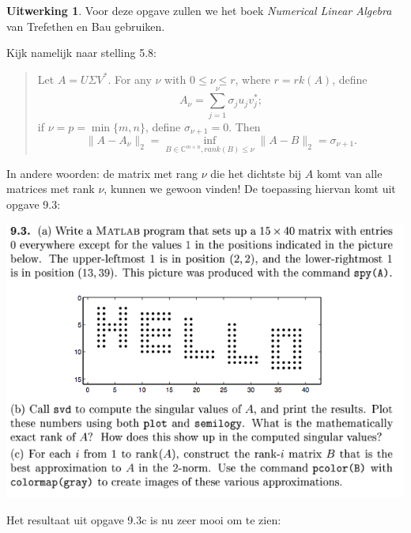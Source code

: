 \documentclass[11pt]{amsart}
\theoremstyle{definition}
\newtheorem*{uitwerking}{Uitwerking}
\newcommand{\C}{\mathbb{C}}
\begin{document}
\begin{uitwerking}
  Voor deze opgave zullen we het boek \emph{Numerical Linear Algebra} van Trefethen en Bau gebruiken.

  Kijk namelijk naar stelling 5.8:
  \begin{quote}
    Let $A = U \Sigma V^*$. For any $\nu$ with $0 \leq \nu \leq r$, where $r = rk(A)$, define
    \[
      A_\nu = \sum_{j=1}^\nu \sigma_j u_j v_j^*; 
    \]
    if $\nu = p = \min{\{m,n\}}$, define $\sigma_{\nu + 1} = 0$. Then
  \[
    \| A - A_\nu \|_2 = \inf_{B \in \C^{m \times n}, rank(B) \leq \nu} \| A - B \|_2 = \sigma_{\nu + 1}.
  \]
  \end{quote}
  In andere woorden: de matrix met rang $\nu$ die het dichtste bij $A$ komt van alle matrices met rank $\nu$, kunnen we gewoon vinden! De toepassing hiervan komt uit opgave 9.3:

  \includegraphics[width=\textwidth]{bla.png}

  Het resultaat uit opgave 9.3c is nu zeer mooi om te zien:


\end{uitwerking}
\end{document}
